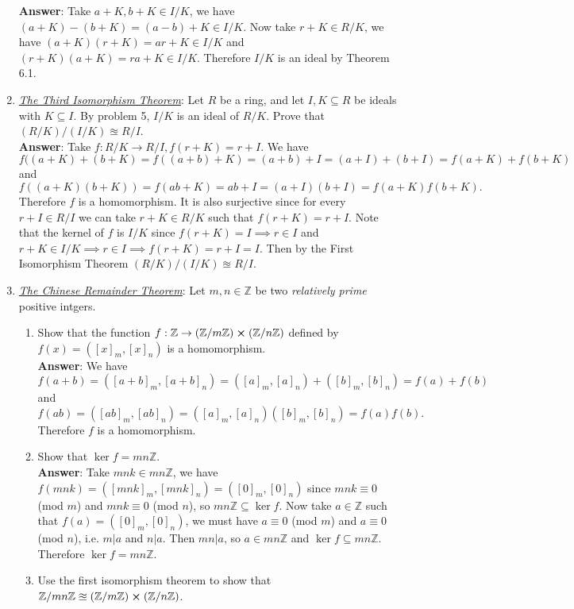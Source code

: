 \documentclass{article}
\begin{document}
\begin{enumerate}
            \textbf{Answer}: Take $a+K,b+K\in I/K$, we have $(a+K)-(b+K)=(a-b)+K\in I/K$. Now take $r+K\in R/K$, we have $(a+K)(r+K)=ar+K\in I/K$ and $(r+K)(a+K)=ra+K\in I/K$. Therefore $I/K$ is an ideal by Theorem 6.1.
      \item \textit{\underline{The Third Isomorphism Theorem}}: Let $R$ be a ring, and let $I,K\subseteq R$ be ideals with $K\subseteq I$. By problem 5, $I/K$ is an ideal of $R/K$. Prove that $(R/K)/(I/K)\approxeq R/I$.\\
            \textbf{Answer}: Take $f:R/K\rightarrow R/I,f(r+K)=r+I$. We have \[f((a+K)+(b+K)=f((a+b)+K)=(a+b)+I=(a+I)+(b+I)=f(a+K)+f(b+K)\] and \[f((a+K)(b+K))=f(ab+K)=ab+I=(a+I)(b+I)=f(a+K)f(b+K).\] Therefore $f$ is a homomorphism. It is also surjective since for every $r+I\in R/I$ we can take $r+K\in R/K$ such that $f(r+K)=r+I$. Note that the kernel of $f$ is $I/K$ since $f(r+K)=I\implies r\in I$ and $r+K\in I/K\implies r\in I\implies f(r+K)=r+I=I$. Then by the First Isomorphism Theorem $(R/K)/(I/K)\approxeq R/I$.
      \item \textit{\underline{The Chinese Remainder Theorem}}: Let $m,n\in\mathbb{Z}$ be two \textit{relatively prime} positive intgers.
            \begin{enumerate}
                  \item Show that the function $f:\mathbb{Z}\rightarrow(\mathbb{Z}/m\mathbb{Z})\cross(\mathbb{Z}/n\mathbb{Z})$ defined by $f(x)=([x]_m,[x]_n)$ is a homomorphism.\\
                        \textbf{Answer}: We have \[f(a+b)=([a+b]_m,[a+b]_n)=([a]_m,[a]_n)+([b]_m,[b]_n)=f(a)+f(b)\] and \[f(ab)=([ab]_m,[ab]_n)=([a]_m,[a]_n)([b]_m,[b]_n)=f(a)f(b).\] Therefore $f$ is a homomorphism.
                  \item Show that $\ker f=mn\mathbb{Z}$.\\
                        \textbf{Answer}: Take $mnk\in mn\mathbb{Z}$, we have $f(mnk)=([mnk]_m,[mnk]_n)=([0]_m,[0]_n)$ since $mnk\equiv 0$ (mod $m$) and $mnk\equiv 0$ (mod $n$), so $mn\mathbb{Z}\subseteq\ker f$. Now take $a\in\mathbb{Z}$ such that $f(a)=([0]_m,[0]_n)$, we must have $a\equiv 0$ (mod $m$) and $a\equiv 0$ (mod $n$), i.e. $m|a$ and $n|a$. Then $mn|a$, so $a\in mn\mathbb{Z}$ and $\ker f\subseteq mn\mathbb{Z}$. Therefore $\ker f=mn\mathbb{Z}$.
                  \item Use the first isomorphism theorem to show that $\mathbb{Z}/mn\mathbb{Z}\approxeq(\mathbb{Z}/m\mathbb{Z})\cross(\mathbb{Z}/n\mathbb{Z})$.\\

\end{enumerate}
\end{enumerate}
\end{document}
